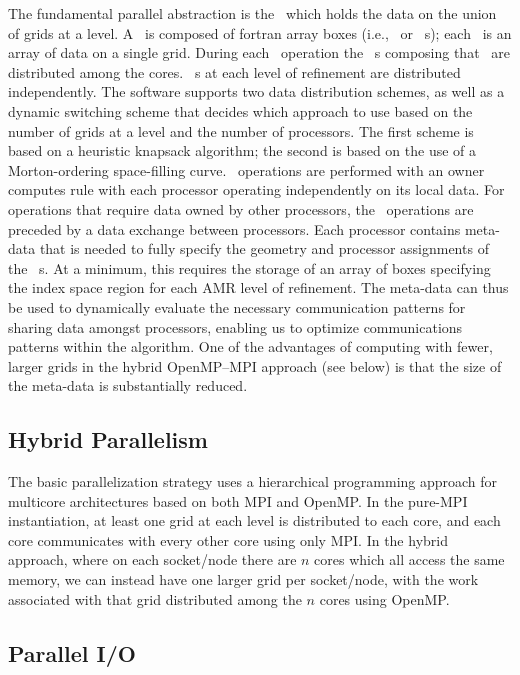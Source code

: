 The fundamental parallel abstraction is the \MultiFab\, which holds the data on the 
union of grids at a level.  A \MultiFab\ is composed of fortran array boxes 
(i.e., \FArrayBox\ or \Fab~s); each \Fab\ is an array of data on a single grid. 
During each \MultiFab\ operation the \Fab~s composing that \MultiFab\ are distributed 
among the cores.  \MultiFab~s at each level of refinement are distributed 
independently.  The software supports two data distribution schemes, as well as a 
dynamic switching scheme that decides which approach to use based on the number of 
grids at a level and the number of processors.  The first scheme is based on a 
heuristic knapsack algorithm; the second is based on the use of a Morton-ordering 
space-filling curve.  \MultiFab\ operations are performed with an owner computes rule 
with each processor operating independently on its local data.  For operations that 
require data owned by other processors, the \MultiFab\ operations are preceded by a 
data exchange between processors.  Each processor contains meta-data that is needed 
to fully specify the geometry and processor assignments of the \MultiFab~s. At a 
minimum, this requires the storage of an array of boxes specifying the index space 
region for each AMR level of refinement.  The meta-data can thus be used to 
dynamically evaluate the necessary communication patterns for sharing data amongst 
processors, enabling us to optimize communications patterns within the algorithm.
One of the advantages of computing with fewer, larger grids in the hybrid 
OpenMP--MPI approach (see below) is that the size of the meta-data is substantially 
reduced.

\subsection{Hybrid Parallelism}

The basic parallelization strategy uses a hierarchical programming approach for 
multicore architectures based on both MPI and OpenMP. In the pure-MPI instantiation, at 
least one grid at each level is distributed to each core, and each core communicates 
with every other core using only MPI.  In the hybrid approach, where on each socket/node 
there are $n$ cores which all access the same memory, we can instead have one larger 
grid per socket/node, with the work associated with that grid distributed among the $n$ 
cores using OpenMP.

\subsection{Parallel I/O}

